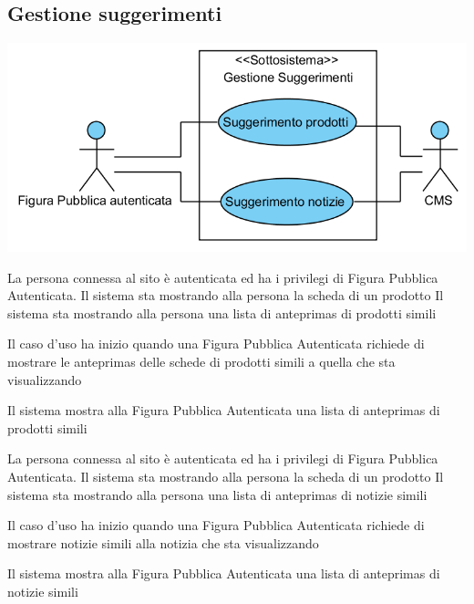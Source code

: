 \subsection{Gestione suggerimenti}
\begin{center}
   \includegraphics[width=\textwidth]{assets/visualParadigm/cu/GestioneSuggerimenti}
\end{center}
{}
{La persona connessa al sito è autenticata ed ha i privilegi di Figura Pubblica Autenticata. Il sistema sta mostrando alla persona la scheda di un prodotto}
{Il sistema sta mostrando alla persona una lista di \glspl{anteprima} di prodotti simili}
{\begin{enumCU}
	\item Il caso d'uso ha inizio quando una Figura Pubblica Autenticata richiede di mostrare le \glspl{anteprima} delle schede di prodotti simili a quella che sta visualizzando
	\item Il sistema mostra alla Figura Pubblica Autenticata una lista di \glspl{anteprima} di prodotti simili
\end{enumCU}}


{}
{La persona connessa al sito è autenticata ed ha i privilegi di Figura Pubblica Autenticata. Il sistema sta mostrando alla persona la scheda di un prodotto}
{Il sistema sta mostrando alla persona una lista di \glspl{anteprima} di notizie simili}
{\begin{enumCU}
	\item Il caso d'uso ha inizio quando una Figura Pubblica Autenticata richiede di mostrare notizie simili alla notizia che sta visualizzando
	\item Il sistema mostra alla Figura Pubblica Autenticata una lista di \glspl{anteprima} di notizie simili
\end{enumCU}}

